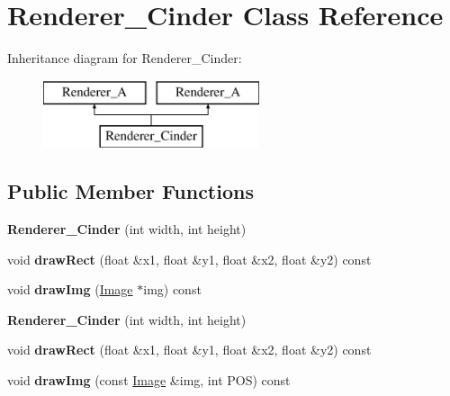 \hypertarget{class_renderer___cinder}{\section{Renderer\-\_\-\-Cinder Class Reference}
\label{class_renderer___cinder}
}
Inheritance diagram for Renderer\-\_\-\-Cinder\-:\begin{figure}[H]
\begin{center}
\leavevmode
\includegraphics[height=2.000000cm]{class_renderer___cinder}
\end{center}
\end{figure}
\subsection*{Public Member Functions}
\begin{DoxyCompactItemize}
\item 
\hypertarget{class_renderer___cinder_af66dfa977f433a3fba7c74fd8afdb292}{{\bfseries Renderer\-\_\-\-Cinder} (int width, int height)}\label{class_renderer___cinder_af66dfa977f433a3fba7c74fd8afdb292}

\item 
\hypertarget{class_renderer___cinder_ae14f510b0f03226b9067ad11b3711c13}{void {\bfseries draw\-Rect} (float \&x1, float \&y1, float \&x2, float \&y2) const }\label{class_renderer___cinder_ae14f510b0f03226b9067ad11b3711c13}

\item 
\hypertarget{class_renderer___cinder_abe70ac6d46e0cf38878e470ebc2b0350}{void {\bfseries draw\-Img} (\hyperlink{class_image}{Image} $\ast$img) const }\label{class_renderer___cinder_abe70ac6d46e0cf38878e470ebc2b0350}

\item 
\hypertarget{class_renderer___cinder_af66dfa977f433a3fba7c74fd8afdb292}{{\bfseries Renderer\-\_\-\-Cinder} (int width, int height)}\label{class_renderer___cinder_af66dfa977f433a3fba7c74fd8afdb292}

\item 
\hypertarget{class_renderer___cinder_ae14f510b0f03226b9067ad11b3711c13}{void {\bfseries draw\-Rect} (float \&x1, float \&y1, float \&x2, float \&y2) const }\label{class_renderer___cinder_ae14f510b0f03226b9067ad11b3711c13}

\item 
\hypertarget{class_renderer___cinder_ad6700d502a42c60b2c97dd6e2b44b80a}{void {\bfseries draw\-Img} (const \hyperlink{class_image}{Image} \&img, int P\-O\-S) const }\label{class_renderer___cinder_ad6700d502a42c60b2c97dd6e2b44b80a}

\end{DoxyCompactItemize}
